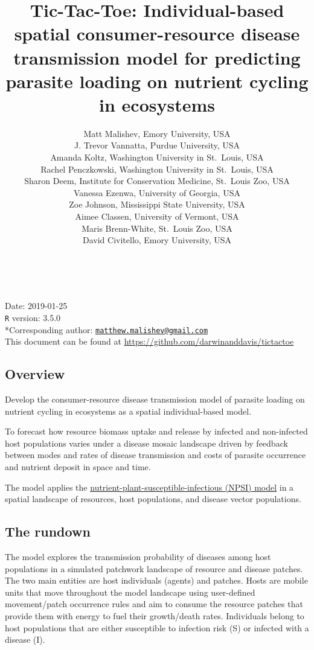 \documentclass[10,portrait]{article}
\title{Tic-Tac-Toe: Individual-based spatial consumer-resource disease
transmission model for predicting parasite loading on nutrient cycling
in ecosystems}
\author{Matt Malishev, Emory University, USA\\
J. Trevor Vannatta, Purdue University, USA\\
Amanda Koltz, Washington University in St.~Louis, USA\\
Rachel Penczkowski, Washington University in St.~Louis, USA\\
Sharon Deem, Institute for Conservation Medicine, St.~Louis Zoo, USA\\
Vanessa Ezenwa, University of Georgia, USA\\
Zoe Johnson, Mississippi State University, USA\\
Aimee Classen, University of Vermont, USA\\
Maris Brenn-White, St.~Louis Zoo, USA\\
David Civitello, Emory University, USA}
\date{}
\begin{document}
\maketitle

{
\hypersetup{linkcolor=black}
\setcounter{tocdepth}{4}
\tableofcontents
}
~

Date: 2019-01-25\\
\texttt{R} version: 3.5.0\\
*Corresponding author:
\href{mailto:matthew.malishev@gmail.com}{\nolinkurl{matthew.malishev@gmail.com}}\\
This document can be found at
\url{https://github.com/darwinanddavis/tictactoe}

\newpage  

\subsection{Overview}\label{overview}

Develop the consumer-resource disease transmission model of parasite
loading on nutrient cycling in ecosystems as a spatial individual-based
model.

To forecast how resource biomass uptake and release by infected and
non-infected host populations varies under a disease mosaic landscape
driven by feedback between modes and rates of disease transmission and
costs of parasite occurrence and nutrient deposit in space and time.

The model applies the
\href{https://github.com/darwinanddavis/LECWorkingGroup}{nutrient-plant-susceptible-infectious
(NPSI) model} in a spatial landscape of resources, host populations, and
disease vector populations.

\subsection{The rundown}\label{the-rundown}

The model explores the transmission probability of diseases among host
populations in a simulated patchwork landscape of resource and disease
patches. The two main entities are host individuals (agents) and
patches. Hosts are mobile units that move throughout the model landscape
using user-defined movement/patch occurrence rules and aim to consume
the resource patches that provide them with energy to fuel their
growth/death rates. Individuals belong to host populations that are
either susceptible to infection risk (S) or infected with a disease (I).
\end{document}

